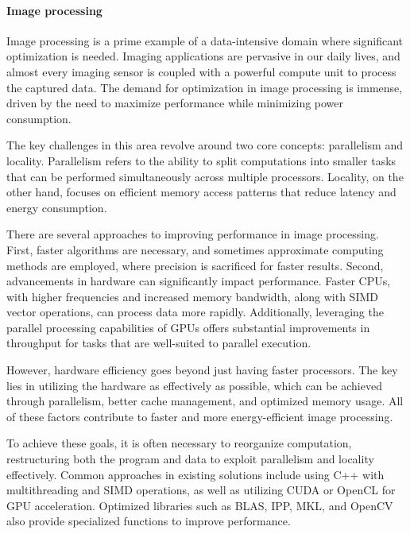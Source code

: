 \paragraph*{Image processing}
Image processing is a prime example of a data-intensive domain where significant optimization is needed. 
Imaging applications are pervasive in our daily lives, and almost every imaging sensor is coupled with a powerful compute unit to process the captured data. 
The demand for optimization in image processing is immense, driven by the need to maximize performance while minimizing power consumption.

The key challenges in this area revolve around two core concepts: parallelism and locality.
Parallelism refers to the ability to split computations into smaller tasks that can be performed simultaneously across multiple processors. 
Locality, on the other hand, focuses on efficient memory access patterns that reduce latency and energy consumption. 

There are several approaches to improving performance in image processing. 
First, faster algorithms are necessary, and sometimes approximate computing methods are employed, where precision is sacrificed for faster results. 
Second, advancements in hardware can significantly impact performance. 
Faster CPUs, with higher frequencies and increased memory bandwidth, along with SIMD vector operations, can process data more rapidly. 
Additionally, leveraging the parallel processing capabilities of GPUs offers substantial improvements in throughput for tasks that are well-suited to parallel execution.

However, hardware efficiency goes beyond just having faster processors. 
The key lies in utilizing the hardware as effectively as possible, which can be achieved through parallelism, better cache management, and optimized memory usage. 
All of these factors contribute to faster and more energy-efficient image processing.

To achieve these goals, it is often necessary to reorganize computation, restructuring both the program and data to exploit parallelism and locality effectively.
Common approaches in existing solutions include using C++ with multithreading and SIMD operations, as well as utilizing CUDA or OpenCL for GPU acceleration. 
Optimized libraries such as BLAS, IPP, MKL, and OpenCV also provide specialized functions to improve performance.

